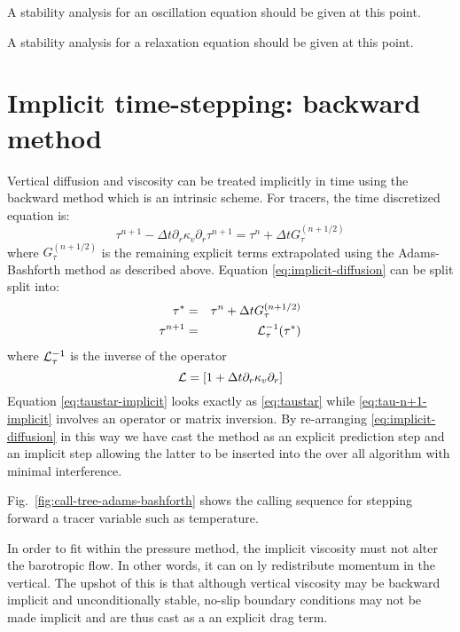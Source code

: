 A stability analysis for an oscillation equation should be given at this point.

A stability analysis for a relaxation equation should be given at this point.


\section{Implicit time-stepping: backward method}

Vertical diffusion and viscosity can be treated implicitly in time
using the backward method which is an intrinsic scheme. For tracers,
the time discretized equation is:
\begin{equation}
\tau^{n+1} - \Delta t \partial_r \kappa_v \partial_r \tau^{n+1} =
\tau^{n} + \Delta t G_\tau^{(n+1/2)}
\label{eq:implicit-diffusion}
\end{equation}
where $G_\tau^{(n+1/2)}$ is the remaining explicit terms extrapolated
using the Adams-Bashforth method as described above.  Equation
\ref{eq:implicit-diffusion} can be split split into:
\begin{eqnarray}
\tau^* & = & \tau^{n} + \Delta t G_\tau^{(n+1/2)}
\label{eq:taustar-implicit} \\
\tau^{n+1} & = & {\cal L}_\tau^{-1} ( \tau^* )
\label{eq:tau-n+1-implicit}
\end{eqnarray}
where ${\cal L}_\tau^{-1}$ is the inverse of the operator
\begin{equation}
{\cal L} = \left[ 1 + \Delta t \partial_r \kappa_v \partial_r \right]
\end{equation}
Equation \ref{eq:taustar-implicit} looks exactly as \ref{eq:taustar}
while \ref{eq:tau-n+1-implicit} involves an operator or matrix
inversion. By re-arranging \ref{eq:implicit-diffusion} in this way we
have cast the method as an explicit prediction step and an implicit
step allowing the latter to be inserted into the over all algorithm
with minimal interference.

Fig.~\ref{fig:call-tree-adams-bashforth} shows the calling sequence for
stepping forward a tracer variable such as temperature.

In order to fit within the pressure method, the implicit viscosity
must not alter the barotropic flow. In other words, it can on ly
redistribute momentum in the vertical. The upshot of this is that
although vertical viscosity may be backward implicit and
unconditionally stable, no-slip boundary conditions may not be made
implicit and are thus cast as a an explicit drag term.

